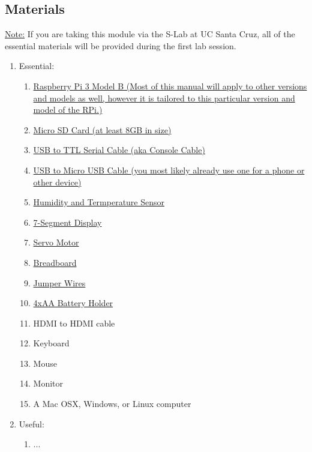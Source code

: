 \documentclass{article}
\begin{document}
  \subsection{Materials}
  \label{sec:materials}
    \underline{Note:} If you are taking this module via the S-Lab at UC Santa Cruz, all of the essential materials will be provided during the first lab session.
    \begin{enumerate}

      \item Essential:
      \begin{enumerate}
        \item \hyperref[sec:vendor-rpi]{Raspberry Pi 3 Model B (Most of this manual will apply to other versions and models as well, however it is tailored to this particular version and model of the RPi.)}
        \item \hyperref[sec:vendor-sd]{Micro SD Card (at least 8GB in size)}
        \item \hyperref[sec:vendor-usbttlserial]{USB to TTL Serial Cable (aka Console Cable)}
        \item \hyperref[sec:vendor-usbmusb]{USB to Micro USB Cable (you most likely already use one for a phone or other device)}
        \item \hyperref[sec:vendor-sensor]{Humidity and Termperature Sensor}
        \item \hyperref[sec:vendor-7seg]{7-Segment Display}
        \item \hyperref[sec:vendor-servo]{Servo Motor}
        \item \hyperref[sec:vendor-breadboard]{Breadboard}
        \item \hyperref[sec:vendor-wires]{Jumper Wires}
        \item \hyperref[sec:vendor-batholder]{4xAA Battery Holder}
        \item HDMI to HDMI cable
        \item Keyboard
        \item Mouse
        \item Monitor
        \item A Mac OSX, Windows, or Linux computer
      \end{enumerate}

      \item Useful:
      \begin{enumerate}
        \item ...
      \end{enumerate}

    \end{enumerate}
\end{document}

